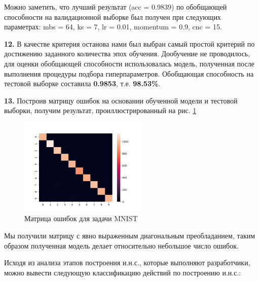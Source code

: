 				Можно заметить, что лучший результат (acc = 0.9839) по обобщающей способности на валидационной выборке был получен при следующих параметрах: mbs = 64, ks = 7, lr = 0.01, momentum = 0.9, cnc = 15.
				
				\textbf{12.} В качестве критерия останова нами был выбран самый простой критерий по достижению заданного количества эпох обучения. Дообучение не проводилось, для оценки обобщающей способности использовалась модель, полученная после выполнения процедуры подбора гиперпараметров. Обобщающая способность на тестовой выборке составила \textbf{0.9853}, т.е. \textbf{98.53\%}.
				
				\textbf{13.} Построив матрицу ошибок на основании обученной модели и тестовой выборки, получим результат, проиллюстрированный на рис. \ref{fig:conf_matrix_result}
				
				\begin{figure}[h]
					\centering
					\includegraphics[width=0.55\textwidth]{author/part3/figures/conf_matrix_result.png}
					\caption{Матрица ошибок для задачи MNIST}
					\label{fig:conf_matrix_result}
				\end{figure}
				
				Мы получили матрицу с явно выраженным диагональным преобладанием, таким образом полученная модель делает относительно небольшое число ошибок.
				
				Исходя из анализа этапов построения и.н.с., которые выполняют разработчики, можно вывести следующую классификацию действий по построению и.н.с.:

